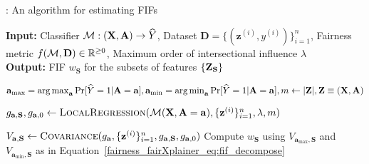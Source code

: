 \begin{algorithm}[t!]
	\small{
	\caption{{\fairXplainer}: An algorithm for estimating FIFs}\label{fairness_fairXplainer_algo:framework}
	\begin{flushleft}
	\hspace*{\algorithmicindent}\textbf{Input:} Classifier $ \mathcal{M}: (\mathbf{X}, \mathbf{A}) \rightarrow \widehat{Y}$, Dataset $\mathbf{D} = \{(\mathbf{z}^{(i)}, y^{(i)})\}_{i=1}^n$, Fairness metric $f(\mathcal{M}, \mathbf{D}) \in \mathbb{R}^{\geq 0}$, Maximum order of intersectional influence $\lambda $\\
	\hspace*{\algorithmicindent}\textbf{Output:} FIF $ w_{\mathbf{S}}$ for the subsets of features $\{\mathbf{Z}_{\mathbf{S}}\}$
	\end{flushleft}

	\begin{algorithmic}[1]
		\State $ \mathbf{a}_{\max} = \operatorname*{arg\,max}_{\mathbf{a}} \Pr[\widehat{Y} = 1 | \mathbf{A} = \mathbf{a}], \mathbf{a}_{\min} = \operatorname*{arg\,min}_{\mathbf{a}} \Pr[\widehat{Y} = 1 | \mathbf{A} = \mathbf{a}], m \gets    |\mathbf{Z}|, \mathbf{Z} \equiv (\mathbf{X}, \mathbf{A}) $
		\label{fairness_fairXplainer_algo_line:fif_computation_start}
		
		 
		\State $ g_{\mathbf{a}, \mathbf{S}},g_{\mathbf{a}, 0} \gets \textsc{LocalRegression}(\mathcal{M}(\mathbf{X}, \mathbf{A} = \mathbf{a}), \{\mathbf{z}^{(i)}\}_{i=1}^n, \lambda, m) $
		
		\State $ V_{\mathbf{a}, \mathbf{S}} \gets \textsc{Covariance}(g_{\mathbf{a}},  \{\mathbf{z}^{(i)}\}_{i=1}^n, g_{\mathbf{a}, \mathbf{S}},g_{\mathbf{a}, 0}) $
		\EndFor
		\State Compute $ w_{\mathbf{S}}$ using  $V_{\mathbf{a}_{\max},\mathbf{S}}$ and $V_{\mathbf{a}_{\min},\mathbf{S}}$ as in Equation~\eqref{fairness_fairXplainer_eq:fif_decompose}
		\label{fairness_fairXplainer_algo_line:fif_computation_end}
		

\end{algorithmic}}
\end{algorithm}

